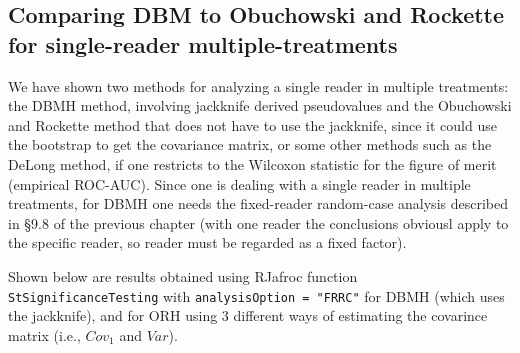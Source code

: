 \documentclass[
]{book}
\begin{document}
\hypertarget{comparing-dbm-to-obuchowski-and-rockette-for-single-reader-multiple-treatments}{%
\subsection{Comparing DBM to Obuchowski and Rockette for single-reader multiple-treatments}\label{comparing-dbm-to-obuchowski-and-rockette-for-single-reader-multiple-treatments}}

We have shown two methods for analyzing a single reader in multiple treatments: the DBMH method, involving jackknife derived pseudovalues and the Obuchowski and Rockette method that does not have to use the jackknife, since it could use the bootstrap to get the covariance matrix, or some other methods such as the DeLong method, if one restricts to the Wilcoxon statistic for the figure of merit (empirical ROC-AUC). Since one is dealing with a single reader in multiple treatments, for DBMH one needs the fixed-reader random-case analysis described in §9.8 of the previous chapter (with one reader the conclusions obviousl apply to the specific reader, so reader must be regarded as a fixed factor).

Shown below are results obtained using RJafroc function \texttt{StSignificanceTesting} with \texttt{analysisOption\ =\ "FRRC"} for DBMH (which uses the jackknife), and for ORH using 3 different ways of estimating the covarince matrix (i.e., \(Cov_1\) and \(Var\)).
\end{document}
